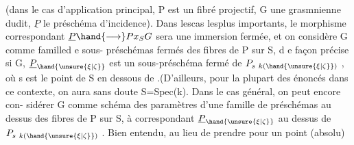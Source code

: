 (dans le cas d'application principal, P est un fibré projectif, G une
grasmnienne dudit, $\underline{P}$ le préschéma d'incidence). Dans lescas lesplus
importants, le morphisme correspondant $\underline{P} \hand{\longrightarrow} Px_S G$ sera une immersion
fermée, et on considère G comme   familled e sous-
préschémas fermés des fibres de P sur S, d e façon précise si \hand{\unsure{\xi|\zeta}} \hand{$\in$} G,
$\underline{P}_{\hand{\unsure{\xi|\zeta}}}$ est un sous-préschéma fermé de $P_{s\ k(\hand{\unsure{\xi|\zeta}})}$ , où s est le point de S en
dessous de \hand{\unsure{\xi|\zeta}} .(D'ailleurs, pour la plupart des énoncés dans ce contexte,
on aura sans doute S=Spec(k)\hand{)}. Dans le cas général, on peut encore con-%
sidérer G comme schéma des paramètres d'une famille de préschémas
au dessus des fibres de P sur S, à \hand{\unsure{\xi|\zeta}} correspondant $\underline{P}_{\hand{\unsure{\xi|\zeta}}}$ au dessus de
$P_{s\ k(\hand{\unsure{\xi|\zeta}})}$ . Bien entendu, au lieu de prendre pour \hand{\unsure{\xi|\zeta}} un point  (absolu)

